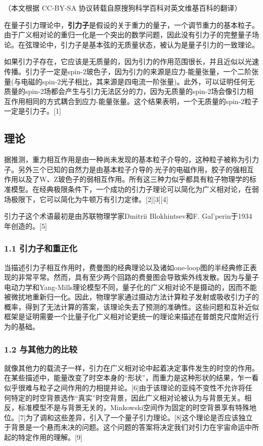 
（本文根据 CC-BY-SA 协议转载自原搜狗科学百科对英文维基百科的翻译）

在量子引力理论中，\textbf{引力子}是假设的关于重力的量子，一个调节重力的基本粒子。由于广义相对论的重归一化是一个突出的数学问题，因此没有引力子的完整量子场论。在弦理论中，引力子是基本弦的无质量状态，被认为是量子引力的一致理论。

如果引力子存在，它应该是无质量的，因为引力的作用范围很长，并且近似以光速传播。引力子一定是spin-2玻色子，因为引力的来源是应力-能量张量，一个二阶张量(与电磁的spin-2光子相比，其来源是四电流一阶张量)。此外，可以证明任何无质量的spin-2场都会产生与引力无法区分的力，因为无质量的spin-2场会像引力相互作用相同的方式耦合到应力-能量张量。这个结果表明，一个无质量的spin-2粒子一定是引力子。[1]

\subsection{理论}
据推测，重力相互作用是由一种尚未发现的基本粒子介导的，这种粒子被称为引力子。另外三个已知的自然力是由基本粒子介导的:光子的电磁作用，胶子的强相互作用以及了W、Z玻色子的弱相互作用。所有这三种力似乎都具有粒子物理学的标准模型。在经典极限条件下，一个成功的引力子理论可以简化为广义相对论，在弱场极限下，它可以简化为牛顿万有引力定律。[2][3][4]

引力子这个术语最初是由苏联物理学家Dmitrii Blokhintsev和F. Gal'perin于1934年创造的。[5]

\subsubsection{1.1 引力子和重正化}
当描述引力子相互作用时，费曼图的经典理论以及诸如one-loop图的半经典修正表现的非常平常。然而，具有至少两个回路的费曼图会导致紫外线发散。因为与量子电动力学和Yang-Mills理论模型不同，量子化的广义相对论不是摄动的，因而不能被微扰地重新归一化。因此，物理学家通过摄动方法计算粒子发射或吸收引力子的概率，得到了无法计算的答案，该理论失去了预测的准确性。这些问题和互补近似框架是证明需要一个比量子化广义相对论更统一的理论来描述在普朗克尺度附近行为的基础。

\subsubsection{1.2 与其他力的比较}
就像其他力的载流子一样，引力在广义相对论中起着决定事件发生的时空的作用。在某些描述中，能量改变了时空本身的“形状”，而重力是这种形状的结果，乍一看似乎很难与粒子之间作用的力相提并论。[6]由于该理论的亚纯不变性不允许将任何特定的时空背景选作“真实”时空背景，因此广义相对论被认为与背景无关。相反，标准模型不是与背景无关的，Minkowski空间作为固定的时空背景享有特殊地位。[7]为了调和这些差异，引入了一个量子引力理论。[8]这个理论是否应该独立于背景是一个悬而未决的问题。这个问题的答案将决定我们对引力在宇宙命运中所起的特定作用的理解。[9]

